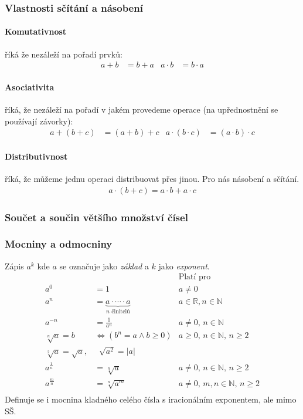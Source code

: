 \documentclass[12pt]{article}
\providecommand{\abs}[1]{\lvert#1\rvert}
\newcommand{\nR}{\mathbb{R}} %
\newcommand{\nN}{\mathbb{N}} %
\begin{document}
\subsubsection{Vlastnosti sčítání a násobení}
\paragraph{Komutativnost} říká že nezáleží na pořadí prvků:
\begin{align}
a+b &= b+a & a \cdot b &= b \cdot a
\end{align}
\paragraph{Asociativita} říká, že nezáleží na pořadí v jakém provedeme operace (na upřednostnění se používají závorky):
\begin{align}
a + ( b+c) &= (a +b) +c & a \cdot ( b \cdot c) &= ( a \cdot b) \cdot c
\end{align}
\paragraph{Distributivnost} říká, že můžeme jednu operaci distribuovat přes jinou. Pro nás násobení a sčítání.
\begin{align}
a \cdot (b +c) = a \cdot b + a \cdot c
\end{align}
\subsubsection{Součet a součin většího množství čísel}
\subsubsection{Mocniny a odmocniny}
Zápis $a^k$ kde $a$ se označuje jako \emph{základ} a $k$ jako \emph{exponent}.
\begin{align}
& & \text{Platí pro}\\
a^0 &= 1 & a \neq 0\\
a^n &= \underbrace{a \cdot \dotsb \cdot a}_{n \text{ činitelů}} &  a \in \nR, n \in \nN \\
a^{-n} &= \frac{1}{a^n} & a \neq 0,\,  n \in \nN \\
\sqrt[n]{a} =b &\iff (b^n = a \land b \geq 0) & a\geq 0,\, n \in \nN,\, n \geq 2\\
\sqrt[2]{a} = \sqrt{a}, &  \; \; \sqrt{a^2} = \abs{a} \\
a^{\frac{1}{n}} &= \sqrt[n]{a} &  a \neq 0,\,  n \in \nN, \, n \geq 2\\
a^{\frac{m}{n}} &= \sqrt[n]{a^m} &  a \neq 0,\,  m,n \in \nN, \, n \geq 2\\
\end{align}
Definuje se i mocnina kladného celého čísla s iracionálním exponentem, ale mimo SŠ.
\end{document}
